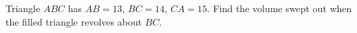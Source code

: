 Triangle $ ABC $ has $ AB=13 $, $ BC=14 $, $ CA=15 $. Find the volume swept out when the filled triangle revolves about $ BC $.
